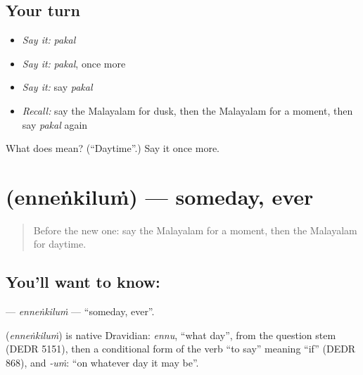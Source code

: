 \subsection*{Your turn}
\begin{itemize}
\raggedright
  \item \emph{Say it:} \emph{pakal}
  \item \emph{Say it:} \emph{pakal}, once more
  \item \emph{Say it:} say \emph{pakal}
  \item \emph{Recall:} say the Malayalam for dusk, then the Malayalam for a moment, then say \emph{pakal} again
\end{itemize}

\begin{tcolorbox}[breakable,colback=teal!4,colframe=teal!35!black,title={Before you move on}]
What does  mean? (\textquotedblleft{}Daytime\textquotedblright{}.) Say it once more.
\end{tcolorbox}
\section[\texorpdfstring{\ml{എന്നെങ്കിലും} (enneṅkiluṁ)}{എന്നെങ്കിലും (enneṅkiluṁ)}]{ (enneṅkiluṁ) — someday, ever}

\label{lesson:ML-C237-ennenkilum}



\begin{quote}
Before the new one: say the Malayalam for a moment, then the Malayalam for daytime.
\end{quote}

\subsection*{You'll want to know: }
\textbf{} — \emph{enneṅkiluṁ} — \textquotedblleft{}someday, ever\textquotedblright{}.

\begin{cousinweb}
\textbf{} (\emph{enneṅkiluṁ}) is native Dravidian: \emph{ennu}, \textquotedblleft{}what day\textquotedblright{}, from the question stem (DEDR 5151), then a conditional form of the verb \textquotedblleft{}to say\textquotedblright{} meaning \textquotedblleft{}if\textquotedblright{} (DEDR 868), and \emph{-uṁ}: \textquotedblleft{}on whatever day it may be\textquotedblright{}.
\end{cousinweb}


